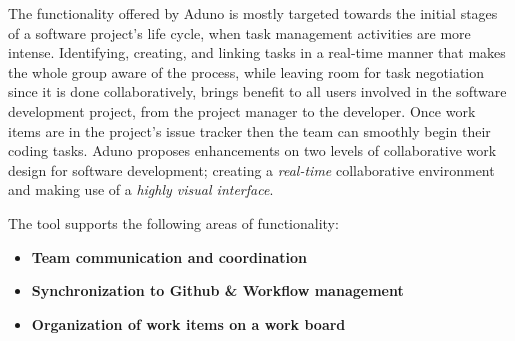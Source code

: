 \documentclass[conference]{IEEEtran}
\begin{document}
The functionality offered by Aduno is mostly targeted towards the initial stages of a software project's life cycle, when task management activities are more intense. Identifying, creating, and linking tasks in a real-time manner that makes the whole group aware of the process, while leaving room for task negotiation since it is done collaboratively, brings benefit to all users involved in the software development project, from the project manager to the developer. Once work items are in the project's issue tracker then the team can smoothly begin their coding tasks. Aduno proposes enhancements on two levels of collaborative work design for software development; creating a \textit{real-time} collaborative environment and making use of a \textit{highly visual interface}.

The tool supports the following areas of functionality:
\begin{itemize}
	\item \textbf{Team communication and coordination}
	\item \textbf{Synchronization to Github \& Workflow management}
	\item \textbf{Organization of work items on a work board}
\end{itemize}
\end{document}

